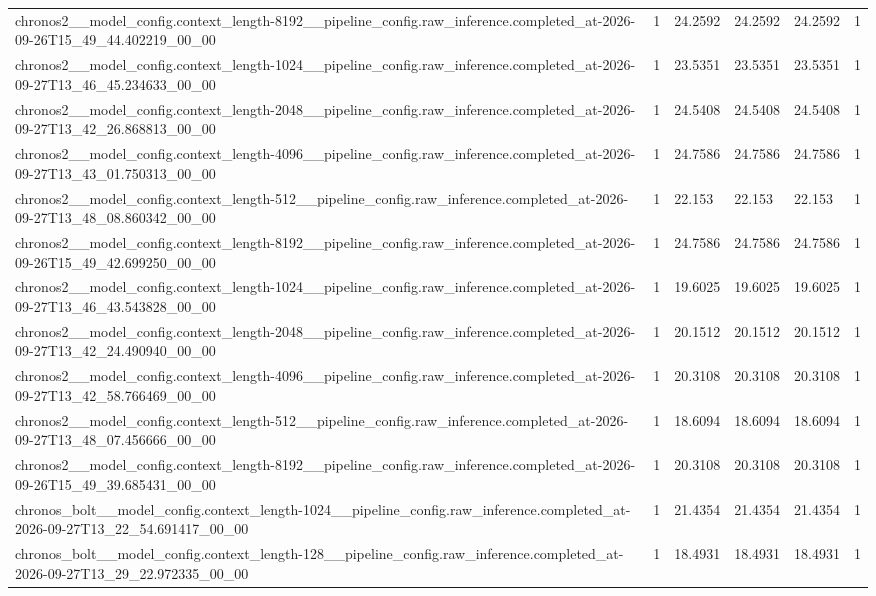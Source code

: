 \begin{tabular}{llllll}
chronos2\_\_model\_config.context\_length-8192\_\_pipeline\_config.raw\_inference.completed\_at-2026-09-26T15\_49\_44.402219\_00\_00 & 1 & 24.2592 & 24.2592 & 24.2592 & 1 \\
chronos2\_\_model\_config.context\_length-1024\_\_pipeline\_config.raw\_inference.completed\_at-2026-09-27T13\_46\_45.234633\_00\_00 & 1 & 23.5351 & 23.5351 & 23.5351 & 1 \\
chronos2\_\_model\_config.context\_length-2048\_\_pipeline\_config.raw\_inference.completed\_at-2026-09-27T13\_42\_26.868813\_00\_00 & 1 & 24.5408 & 24.5408 & 24.5408 & 1 \\
chronos2\_\_model\_config.context\_length-4096\_\_pipeline\_config.raw\_inference.completed\_at-2026-09-27T13\_43\_01.750313\_00\_00 & 1 & 24.7586 & 24.7586 & 24.7586 & 1 \\
chronos2\_\_model\_config.context\_length-512\_\_pipeline\_config.raw\_inference.completed\_at-2026-09-27T13\_48\_08.860342\_00\_00 & 1 & 22.153 & 22.153 & 22.153 & 1 \\
chronos2\_\_model\_config.context\_length-8192\_\_pipeline\_config.raw\_inference.completed\_at-2026-09-26T15\_49\_42.699250\_00\_00 & 1 & 24.7586 & 24.7586 & 24.7586 & 1 \\
chronos2\_\_model\_config.context\_length-1024\_\_pipeline\_config.raw\_inference.completed\_at-2026-09-27T13\_46\_43.543828\_00\_00 & 1 & 19.6025 & 19.6025 & 19.6025 & 1 \\
chronos2\_\_model\_config.context\_length-2048\_\_pipeline\_config.raw\_inference.completed\_at-2026-09-27T13\_42\_24.490940\_00\_00 & 1 & 20.1512 & 20.1512 & 20.1512 & 1 \\
chronos2\_\_model\_config.context\_length-4096\_\_pipeline\_config.raw\_inference.completed\_at-2026-09-27T13\_42\_58.766469\_00\_00 & 1 & 20.3108 & 20.3108 & 20.3108 & 1 \\
chronos2\_\_model\_config.context\_length-512\_\_pipeline\_config.raw\_inference.completed\_at-2026-09-27T13\_48\_07.456666\_00\_00 & 1 & 18.6094 & 18.6094 & 18.6094 & 1 \\
chronos2\_\_model\_config.context\_length-8192\_\_pipeline\_config.raw\_inference.completed\_at-2026-09-26T15\_49\_39.685431\_00\_00 & 1 & 20.3108 & 20.3108 & 20.3108 & 1 \\
chronos\_bolt\_\_model\_config.context\_length-1024\_\_pipeline\_config.raw\_inference.completed\_at-2026-09-27T13\_22\_54.691417\_00\_00 & 1 & 21.4354 & 21.4354 & 21.4354 & 1 \\
chronos\_bolt\_\_model\_config.context\_length-128\_\_pipeline\_config.raw\_inference.completed\_at-2026-09-27T13\_29\_22.972335\_00\_00 & 1 & 18.4931 & 18.4931 & 18.4931 & 1 \\

\end{tabular}
